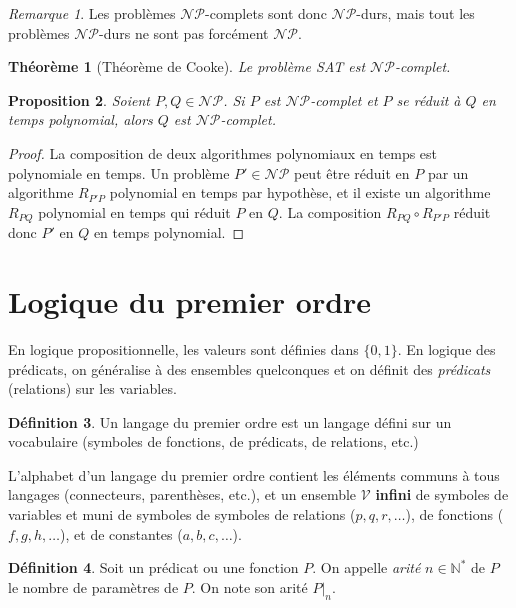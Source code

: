 \documentclass{article}
\newtheorem{thm}{Théorème}[section]
\newtheorem{prp}[thm]{Proposition}
\theoremstyle{definition}
\newtheorem{déf}[thm]{Définition}
\theoremstyle{remark}
\newtheorem*{rmq}{Remarque}
\newcommand{\N}{\mathbb N}
\newcommand{\NP}{\mathcal {NP}}
\begin{document}
	\begin{rmq} Les problèmes $\NP$-complets sont donc $\NP$-durs, mais tout les problèmes $\NP$-durs ne sont pas forcément $\NP$.
	\end{rmq}

	\begin{thm}[Théorème de Cooke] Le problème SAT est $\NP$-complet.
	\end{thm}

	\begin{prp} Soient $P, Q \in \NP$. Si $P$ est $\NP$-complet et $P$ se réduit à $Q$ en temps polynomial, alors $Q$ est $\NP$-complet.
	\end{prp}

	\begin{proof} La composition de deux algorithmes polynomiaux en temps est polynomiale en temps. Un problème $P' \in \NP$ peut être
	réduit en $P$ par un algorithme $R_{P'P}$ polynomial en temps par hypothèse, et il existe un algorithme $R_{PQ}$ polynomial en temps
	qui réduit $P$ en $Q$. La composition $R_{PQ} \circ R_{P'P}$ réduit donc $P'$ en $Q$ en temps polynomial.
	\end{proof}

\section{Logique du premier ordre}
	En logique propositionnelle, les valeurs sont définies dans $\{0, 1\}$. En logique des prédicats, on généralise à des ensembles quelconques et on définit
	des \textit{prédicats} (relations) sur les variables.

	\begin{déf} Un langage du premier ordre est un langage défini sur un vocabulaire (symboles de fonctions, de prédicats, de relations, etc.)
	\end{déf}

	L'alphabet d'un langage du premier ordre contient les éléments communs à tous langages (connecteurs, parenthèses, etc.), et un ensemble $\mathcal V$
	\textbf{infini} de symboles de variables et muni de symboles de symboles de relations ($p, q, r, \ldots$), de fonctions ($f, g, h, \ldots$), et de
	constantes ($a, b, c, \ldots$).

	\begin{déf} Soit un prédicat ou une fonction $P$. On appelle \textit{arité} $n \in \N^*$ de $P$ le nombre de paramètres de $P$. On note son arité $P|_n$.
	\end{déf}
\end{document}
